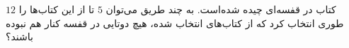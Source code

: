 \EXERCISE
$12$
کتاب در قفسه‌ای چیده شده‌است. به چند طریق می‌توان
$5$
تا از این کتاب‌ها را طوری انتخاب کرد که از کتاب‌های انتخاب شده، هیچ دوتایی در قفسه کنار هم نبوده باشند؟